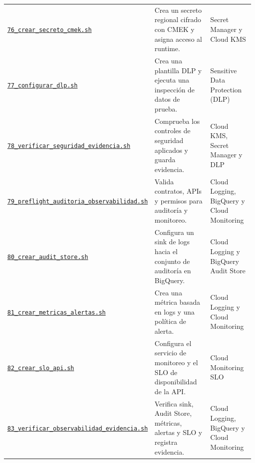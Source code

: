 \documentclass[11pt]{article}
\begin{document}
\begin{longtable}{@{}>{\raggedright\arraybackslash}p{}>{\raggedright\arraybackslash}p{}>{\raggedright\arraybackslash}p{}@{}}
\href{https://github.com/Codenid/lumina-retail-data-platform/blob/main/implementation/automatizacion/scripts76_crear_secreto_cmek.sh}{\texttt{76\_\allowbreak{}crear\_\allowbreak{}secreto\_\allowbreak{}cmek.sh}} & Crea un secreto regional cifrado con CMEK y asigna acceso al runtime. & Secret Manager y Cloud KMS \\
\href{https://github.com/Codenid/lumina-retail-data-platform/blob/main/implementation/automatizacion/scripts77_configurar_dlp.sh}{\texttt{77\_\allowbreak{}configurar\_\allowbreak{}dlp.sh}} & Crea una plantilla DLP y ejecuta una inspección de datos de prueba. & Sensitive Data Protection (DLP) \\
\href{https://github.com/Codenid/lumina-retail-data-platform/blob/main/implementation/automatizacion/scripts78_verificar_seguridad_evidencia.sh}{\texttt{78\_\allowbreak{}verificar\_\allowbreak{}seguridad\_\allowbreak{}evidencia.sh}} & Comprueba los controles de seguridad aplicados y guarda evidencia. & Cloud KMS, Secret Manager y DLP \\
\href{https://github.com/Codenid/lumina-retail-data-platform/blob/main/implementation/automatizacion/scripts79_preflight_auditoria_observabilidad.sh}{\texttt{79\_\allowbreak{}preflight\_\allowbreak{}auditoria\_\allowbreak{}observabilidad.sh}} & Valida contratos, APIs y permisos para auditoría y monitoreo. & Cloud Logging, BigQuery y Cloud Monitoring \\
\href{https://github.com/Codenid/lumina-retail-data-platform/blob/main/implementation/automatizacion/scripts80_crear_audit_store.sh}{\texttt{80\_\allowbreak{}crear\_\allowbreak{}audit\_\allowbreak{}store.sh}} & Configura un sink de logs hacia el conjunto de auditoría en BigQuery. & Cloud Logging y BigQuery Audit Store \\
\href{https://github.com/Codenid/lumina-retail-data-platform/blob/main/implementation/automatizacion/scripts81_crear_metricas_alertas.sh}{\texttt{81\_\allowbreak{}crear\_\allowbreak{}metricas\_\allowbreak{}alertas.sh}} & Crea una métrica basada en logs y una política de alerta. & Cloud Logging y Cloud Monitoring \\
\href{https://github.com/Codenid/lumina-retail-data-platform/blob/main/implementation/automatizacion/scripts82_crear_slo_api.sh}{\texttt{82\_\allowbreak{}crear\_\allowbreak{}slo\_\allowbreak{}api.sh}} & Configura el servicio de monitoreo y el SLO de disponibilidad de la API. & Cloud Monitoring SLO \\
\href{https://github.com/Codenid/lumina-retail-data-platform/blob/main/implementation/automatizacion/scripts83_verificar_observabilidad_evidencia.sh}{\texttt{83\_\allowbreak{}verificar\_\allowbreak{}observabilidad\_\allowbreak{}evidencia.sh}} & Verifica sink, Audit Store, métricas, alertas y SLO y registra evidencia. & Cloud Logging, BigQuery y Cloud Monitoring \\
\bottomrule
\end{longtable}
\endgroup
\end{document}
